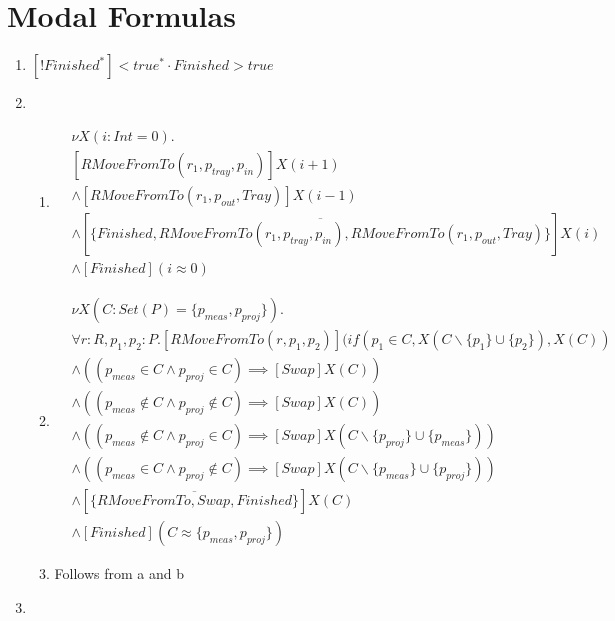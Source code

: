 \section{Modal Formulas}
\begin{enumerate}
    \item $[!Finished^{*}]<true^{*} \cdot Finished>true$
    \item \begin{enumerate}
        \item \begin{align*}
            &\nu X(i:Int = 0) . & \\
            &[RMoveFromTo(r_1, p_\mathit{tray}, p_\mathit{in})]X(i+1) \\
            &\wedge [RMoveFromTo(r_1, p_\mathit{out}, Tray)]X(i-1) \\
            &\wedge [\overline{\{Finished,RMoveFromTo(r_1, p_\mathit{tray}, p_\mathit{in}),RMoveFromTo(r_1, p_\mathit{out}, Tray)\}}]X(i) \\
            &\wedge [Finished](i \approx 0)
        \end{align*}
        \item \begin{align*}
            &\nu X(C : Set(P) = \{p_\mathit{meas},p_\mathit{proj}\}).\\
            & \forall r:R, p_1, p_2 : P . [RMoveFromTo(r, p_1, p_2)](if(p_1 \in C, X(C\backslash\{p_1\}\cup\{p_2\}), X(C))\\
            &\wedge ((p_\mathit{meas} \in C \wedge p_\mathit{proj} \in C) \implies [Swap]X(C))\\
            &\wedge ((p_\mathit{meas} \notin C \wedge p_\mathit{proj} \notin C) \implies [Swap]X(C))\\
            &\wedge ((p_\mathit{meas} \notin C \wedge p_\mathit{proj} \in C) \implies [Swap]X(C\backslash\{p_\mathit{proj}\} \cup \{p_\mathit{meas}\}))\\
            &\wedge ((p_\mathit{meas} \in C \wedge p_\mathit{proj} \notin C) \implies [Swap]X(C\backslash\{p_\mathit{meas}\} \cup \{p_\mathit{proj}\}))\\
            &\wedge [\overline{\{RMoveFromTo, Swap, Finished\}}]X(C)\\
            &\wedge [Finished](C \approx \{p_\mathit{meas},p_\mathit{proj}\})
        \end{align*}
        \item Follows from a and b
    \end{enumerate}
    \item \begin{enumerate}

\end{enumerate}
\end{enumerate}
